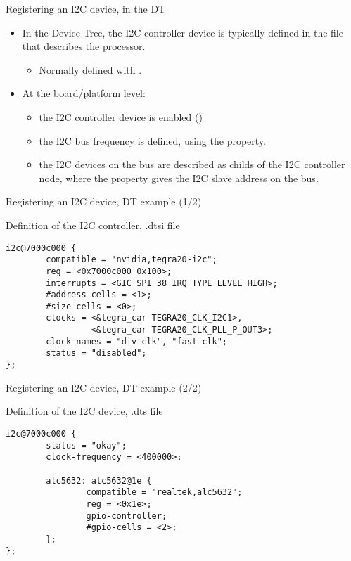 \begin{frame}{Registering an I2C device, in the DT}
  \begin{itemize}
  \item In the Device Tree, the I2C controller device is typically
    defined in the  file that describes the processor.
    \begin{itemize}
    \item Normally defined with .
    \end{itemize}
  \item At the board/platform level:
    \begin{itemize}
    \item the I2C controller device is enabled
      ()
    \item the I2C bus frequency is defined, using the
       property.
    \item the I2C devices on the bus are described as childs of the
      I2C controller node, where the  property gives the I2C
      slave address on the bus.
    \end{itemize}
  \end{itemize}
\end{frame}

\begin{frame}[fragile]{Registering an I2C device, DT example (1/2)}
  \begin{block}{Definition of the I2C controller, .dtsi file}
    \begin{verbatim}
i2c@7000c000 {
        compatible = "nvidia,tegra20-i2c";
        reg = <0x7000c000 0x100>;
        interrupts = <GIC_SPI 38 IRQ_TYPE_LEVEL_HIGH>;
        #address-cells = <1>;
        #size-cells = <0>;
        clocks = <&tegra_car TEGRA20_CLK_I2C1>,
                 <&tegra_car TEGRA20_CLK_PLL_P_OUT3>;
        clock-names = "div-clk", "fast-clk";
        status = "disabled";
};
    \end{verbatim}
  \end{block}
\end{frame}

\begin{frame}[fragile]{Registering an I2C device, DT example (2/2)}
  \begin{block}{Definition of the I2C device, .dts file}
    \begin{verbatim}
i2c@7000c000 {
        status = "okay";
        clock-frequency = <400000>;

        alc5632: alc5632@1e {
                compatible = "realtek,alc5632";
                reg = <0x1e>;
                gpio-controller;
                #gpio-cells = <2>;
        };
};
    \end{verbatim}
  \end{block}
\end{frame}

